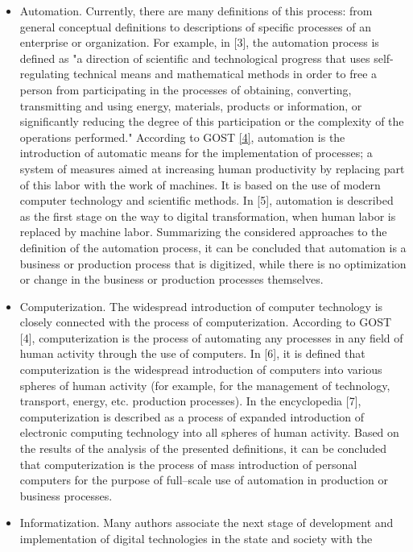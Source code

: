\documentclass{article}
\begin{document}
\begin{multicols}{2}
\begin{itemize}
\setlength\itemsep{-4.8pt}
    \item Automation. Currently, there are many definitions
of this process: from general conceptual definitions
to descriptions of specific processes of an enterprise
or organization. For example, in [3], the automation
process is defined as "a direction of scientific and
technological progress that uses self-regulating technical means and mathematical methods in order to
free a person from participating in the processes of
obtaining, converting, transmitting and using energy,
materials, products or information, or significantly
reducing the degree of this participation or the
complexity of the operations performed." According
to GOST \href{https://standartgost.ru/g/%D0%93%D0%9E%D0%A1%D0%A2_33707-2016}{[4]},
automation is the introduction of automatic means for the implementation of processes;
a system of measures aimed at increasing human
productivity by replacing part of this labor with the
work of machines. It is based on the use of modern
computer technology and scientific methods. In [5],
automation is described as the first stage on the
way to digital transformation, when human labor is
replaced by machine labor. Summarizing the considered approaches to the definition of the automation
process, it can be concluded that automation is
a business or production process that is digitized,
while there is no optimization or change in the
business or production processes themselves.
\item Computerization. The widespread introduction of
computer technology is closely connected with the
process of computerization. According to GOST [4],
computerization is the process of automating any
processes in any field of human activity through
the use of computers. In [6], it is defined that
computerization is the widespread introduction of
computers into various spheres of human activity
(for example, for the management of technology,
transport, energy, etc. production processes). In the
encyclopedia [7], computerization is described as
a process of expanded introduction of electronic
computing technology into all spheres of human
activity. Based on the results of the analysis of the
presented definitions, it can be concluded that computerization is the process of mass introduction of
personal computers for the purpose of full–scale use
of automation in production or business processes.
\item Informatization. Many authors associate the next
stage of development and implementation of digital technologies in the state and society with the

\end{itemize}
\end{multicols}
\end{document}
